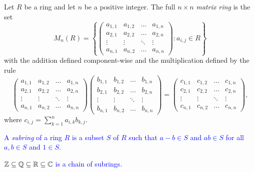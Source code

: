 \begin{example}	
Let $R$ be a ring and let $n$ be a positive integer. 
The full $n\times n$ {\em matrix ring} is the set
$$M_n(R)=\left\{\left(\begin{array}{cccc}
	a_{1,1}&a_{1,2}&\ldots&a_{1,n}\\
	a_{2,1}&a_{2,2}&\ldots&a_{2,n}\\
	\vdots&\vdots&\ddots&\vdots\\
	a_{n,1}&a_{n,2}&\ldots&a_{n,n}
	\end{array}\right): a_{i,j}\in R\right\}$$
with the addition defined component-wise and the multiplication defined by the rule
$$\left(\begin{array}{cccc}
	a_{1,1}&a_{1,2}&\ldots&a_{1,n}\\
	a_{2,1}&a_{2,2}&\ldots&a_{2,n}\\
	\vdots&\vdots&\ddots&\vdots\\
	a_{n,1}&a_{n,2}&\ldots&a_{n,n}
\end{array}\right)\left(\begin{array}{cccc}
b_{1,1}&b_{1,2}&\ldots&b_{1,n}\\
b_{2,1}&b_{2,2}&\ldots&b_{2,n}\\
\vdots&\vdots&\ddots&\vdots\\
b_{n,1}&b_{n,2}&\ldots&b_{n,n}
\end{array}\right)=\left(\begin{array}{cccc}
	c_{1,1}&c_{1,2}&\ldots&c_{1,n}\\
	c_{2,1}&c_{2,2}&\ldots&c_{2,n}\\
	\vdots&\vdots&\ddots&\vdots\\
	c_{n,1}&c_{n,2}&\ldots&c_{n,n}
\end{array}\right),$$
where $c_{i,j}=\sum_{k=1}^na_{i,k}b_{k,j}$.
\end{example}

\textcolor{blue}{A {\em subring} of a ring $R$ is a subset $S$ of $R$ such that
$a-b\in S$ and $ab\in S$ for all $a,b\in S$ 
and $1\in S$.}


\begin{example}
    \textcolor{blue}{$\mathbb{Z}\subseteq\mathbb{Q}\subseteq\mathbb{R}\subseteq\mathbb{C}$ is a chain of subrings.}
\end{example}

